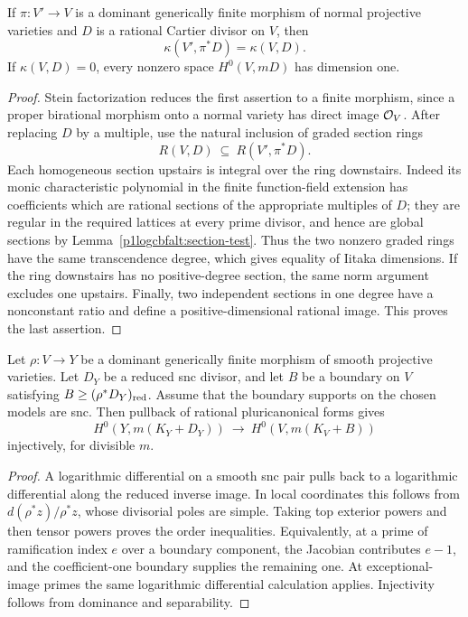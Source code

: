 \begin{lemma}\label{p1logcbfalt:finite}
If \(\pi:V'\to V\) is a dominant generically finite morphism of normal
projective varieties and \(D\) is a rational Cartier divisor on \(V\),
then
\[
\kappa(V',\pi^*D)=\kappa(V,D).
\]
If \(\kappa(V,D)=0\), every nonzero space \(H^0(V,mD)\) has dimension
one.
\end{lemma}

\begin{proof}
Stein factorization reduces the first assertion to a finite morphism,
since a proper birational morphism onto a normal variety has direct image
\(\mathcal O_V\). After replacing \(D\) by a multiple, use the natural inclusion
of graded section rings
\[
R(V,D)\ \subseteq\ R(V',\pi^*D).
\]
Each homogeneous section upstairs is integral over the ring downstairs.
Indeed its monic characteristic polynomial in the finite function-field
extension has coefficients which are rational sections of the appropriate
multiples of \(D\); they are regular in the required lattices at every
prime divisor, and hence are global sections by
Lemma~\ref{p1logcbfalt:section-test}. Thus the two nonzero graded rings have the
same transcendence degree, which gives equality of Iitaka dimensions.
If the ring downstairs has no positive-degree section, the same norm
argument excludes one upstairs. Finally, two independent sections in one
degree have a nonconstant ratio and define a positive-dimensional
rational image. This proves the last assertion.
\end{proof}

\begin{lemma}\label{p1logcbfalt:log-pullback}
Let \(\rho:V\to Y\) be a dominant generically finite morphism of smooth projective
varieties. Let \(D_Y\) be a reduced snc divisor, and let \(B\) be a
boundary on \(V\) satisfying \(B\ge(\rho^*D_Y)_{\mathrm{red}}\). Assume that the
boundary supports on the chosen models are snc. Then pullback of rational
pluricanonical forms gives
\[
H^0(Y,m(K_Y+D_Y))\ \longrightarrow\
H^0(V,m(K_V+B))
\]
injectively, for divisible \(m\).
\end{lemma}

\begin{proof}
A logarithmic differential on a smooth snc pair pulls back to a
logarithmic differential along the reduced inverse image. In local
coordinates this follows from
\(d(\rho^*z)/\rho^*z\), whose divisorial poles are simple. Taking top
exterior powers and then tensor powers proves the order inequalities.
Equivalently, at a prime of ramification index \(e\) over a boundary
component, the Jacobian contributes \(e-1\), and the coefficient-one
boundary supplies the remaining one. At exceptional-image primes the
same logarithmic differential calculation applies. Injectivity follows
from dominance and separability.
\end{proof}

